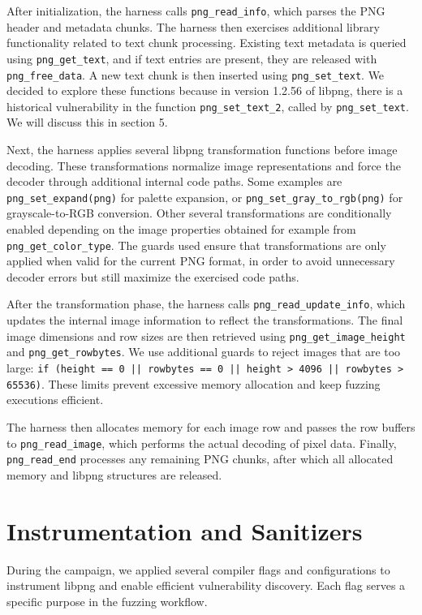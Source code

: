 After initialization, the harness calls \texttt{png\_read\_info}, which parses the PNG header and metadata chunks. The harness then exercises additional library functionality related to text chunk processing. Existing text metadata is queried using \texttt{png\_get\_text}, and if text entries are present, they are released with \texttt{png\_free\_data}. A new text chunk is then inserted using \texttt{png\_set\_text}. We decided to explore these functions because in version 1.2.56 of libpng, there is a historical vulnerability in the function \texttt{png\_set\_text\_2}, called by \texttt{png\_set\_text}. We will discuss this in section 5.

Next, the harness applies several libpng transformation functions before image decoding. These transformations normalize image representations and force the decoder through additional internal code paths. Some examples are \texttt{png\_set\_expand(png)} for palette expansion, or \texttt{png\_set\_gray\_to\_rgb(png)} for grayscale-to-RGB conversion. Other several transformations are conditionally enabled depending on the image properties obtained for example from \texttt{png\_get\_color\_type}. The guards used ensure that transformations are only applied when valid for the current PNG format, in order to avoid unnecessary decoder errors but still maximize the exercised code paths.

After the transformation phase, the harness calls \texttt{png\_read\_update\_info}, which updates the internal image information to reflect the transformations. The final image dimensions and row sizes are then retrieved using \texttt{png\_get\_image\_height} and \texttt{png\_get\_rowbytes}. We use additional guards to reject images that are too large: \texttt{if (height == 0 || rowbytes == 0 || height > 4096 || rowbytes > 65536)}. These limits prevent excessive memory allocation and keep fuzzing executions efficient.

The harness then allocates memory for each image row and passes the row buffers to \texttt{png\_read\_image}, which performs the actual decoding of pixel data. Finally, \texttt{png\_read\_end} processes any remaining PNG chunks, after which all allocated memory and libpng structures are released.
\section{Instrumentation and Sanitizers}
During the campaign, we applied several compiler flags and configurations to instrument libpng and enable efficient vulnerability discovery. Each flag serves a specific purpose in the fuzzing workflow.

